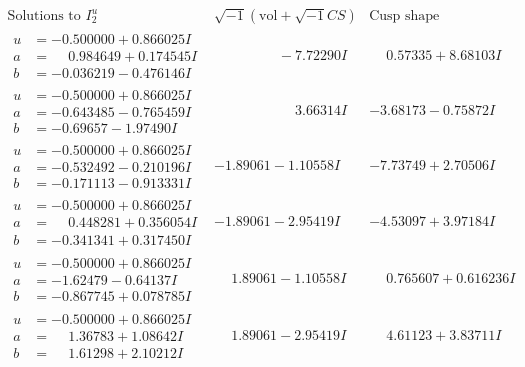 \documentclass[1p]{elsarticle_modified}
\theoremstyle{definition}
\newcommand{\I}{\sqrt{-1}}
\begin{document}
$$\begin{array}{c|c|c}  
\text{Solutions to }I^u_{2}& \I (\text{vol} + \sqrt{-1}CS) & \text{Cusp shape}\\
 \hline 
\begin{aligned}
u &= -0.500000 + 0.866025 I \\
a &= \phantom{-}0.984649 + 0.174545 I \\
b &= -0.036219 - 0.476146 I\end{aligned}
 & \phantom{-0.000000 } -7.72290 I & \phantom{-}0.57335 + 8.68103 I \\ \hline\begin{aligned}
u &= -0.500000 + 0.866025 I \\
a &= -0.643485 - 0.765459 I \\
b &= -0.69657 - 1.97490 I\end{aligned}
 & \phantom{-0.000000 -}3.66314 I & -3.68173 - 0.75872 I \\ \hline\begin{aligned}
u &= -0.500000 + 0.866025 I \\
a &= -0.532492 - 0.210196 I \\
b &= -0.171113 - 0.913331 I\end{aligned}
 & -1.89061 - 1.10558 I & -7.73749 + 2.70506 I \\ \hline\begin{aligned}
u &= -0.500000 + 0.866025 I \\
a &= \phantom{-}0.448281 + 0.356054 I \\
b &= -0.341341 + 0.317450 I\end{aligned}
 & -1.89061 - 2.95419 I & -4.53097 + 3.97184 I \\ \hline\begin{aligned}
u &= -0.500000 + 0.866025 I \\
a &= -1.62479 - 0.64137 I \\
b &= -0.867745 + 0.078785 I\end{aligned}
 & \phantom{-}1.89061 - 1.10558 I & \phantom{-}0.765607 + 0.616236 I \\ \hline\begin{aligned}
u &= -0.500000 + 0.866025 I \\
a &= \phantom{-}1.36783 + 1.08642 I \\
b &= \phantom{-}1.61298 + 2.10212 I\end{aligned}
 & \phantom{-}1.89061 - 2.95419 I & \phantom{-}4.61123 + 3.83711 I \\ \hline\begin{aligned}

\end{aligned}
\end{array}$$
\end{document}
